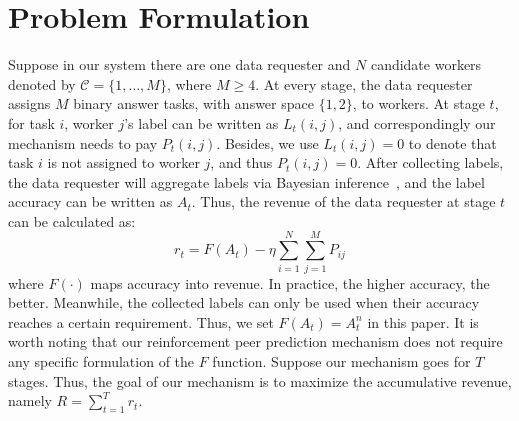 \documentclass{article}
\begin{document}
\section{Problem Formulation}
Suppose in our system there are one data requester and $N$ candidate workers denoted by $\mathcal{C}=\{1,\ldots, M\}$, where $M\geq 4$.
At every stage, the data requester assigns $M$ binary answer tasks, with answer space $\{1,2\}$, to workers.
At stage $t$, for task $i$, worker $j$'s label can be written as $L_{t}(i,j)$, and correspondingly our mechanism needs to pay $P_{t}(i,j)$.
Besides, we use $L_{t}(i,j)=0$ to denote that task $i$ is not assigned to worker $j$, and thus $P_{t}(i,j)=0$.
After collecting labels, the data requester will aggregate labels via Bayesian inference~\cite{zheng2017truth}, and the label accuracy can be written as $A_t$.
Thus, the revenue of the data requester at stage $t$ can be calculated as:
\begin{equation}
r_t = F(A_t) - \eta {\sum}_{i=1}^{N}{\sum}_{j=1}^{M}P_{ij}
\end{equation}
where $F(\cdot)$ maps accuracy into revenue. In practice, the higher accuracy, the better. Meanwhile, the collected labels can only be used when their accuracy reaches a certain requirement.
Thus, we set $F(A_t)=A^{n}_t$ in this paper.
It is worth noting that our reinforcement peer prediction mechanism does not require any specific formulation of the $F$ function.
Suppose our mechanism goes for $T$ stages.
Thus, the goal of our mechanism is to maximize the accumulative revenue, namely $R = \sum_{t=1}^{T} r_t$.
\end{document}
